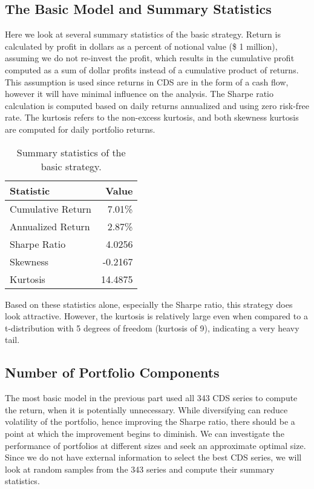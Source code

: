 \documentclass[11pt]{article}
\theoremstyle{definition}
\begin{document}
\subsection{The Basic Model and Summary Statistics}

Here we look at several summary statistics
of the basic strategy.
Return is calculated by profit in dollars as a percent of 
notional value (\$ 1 million), 
assuming we do not re-invest the profit,
which results in the cumulative profit 
computed as a sum of dollar profits 
instead of a cumulative product of returns.
This assumption is used since returns in CDS 
are in the form of a cash flow,
however it will have minimal influence on the analysis.
The Sharpe ratio calculation is computed based on
daily returns annualized and using zero risk-free rate.
The kurtosis refers to the non-excess kurtosis,
and both skewness kurtosis are computed for daily 
portfolio returns.

\begin{table}[h]
\centering
\begin{tabular}{ | l | r | }
  \hline      
  Statistic & Value \\
  \hline
  Cumulative Return & 7.01\% \\
  Annualized Return & 2.87\% \\
  Sharpe Ratio & 4.0256 \\
  Skewness & -0.2167 \\
  Kurtosis & 14.4875 \\
  \hline  
\end{tabular}
\caption{Summary statistics of the basic strategy.}
\label{tab:basic_summary}
\end{table}

Based on these statistics alone, especially the Sharpe ratio, 
this strategy does look attractive. 
However, the kurtosis is relatively large
even when compared to a t-distribution with 5 degrees of freedom
(kurtosis of 9),
indicating a very heavy tail.











\subsection{Number of Portfolio Components}

The most basic model in the previous part 
used all 343 CDS series to 
compute the return, when it is potentially unnecessary.
While diversifying can reduce volatility 
of the portfolio, hence improving the Sharpe ratio,
there should be a point at which the improvement 
begins to diminish.
We can investigate the performance of portfolios 
at different sizes and seek an approximate 
optimal size.
Since we do not have external information to 
select the best CDS series,
we will look at random samples from the 343 series 
and compute their summary statistics.
\end{document}
